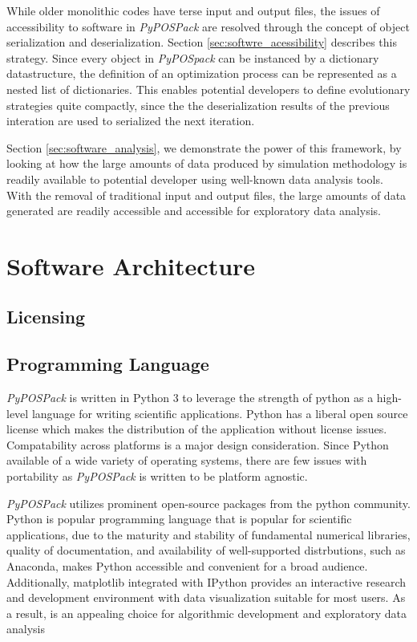 While older monolithic codes have terse input and output files, the issues of accessibility to software in \emph{PyPOSPack} are resolved through the concept of object serialization and deserialization.  Section \ref{sec:softwre_acessibility} describes this strategy.  Since every object in \emph{PyPOSpack} can be instanced by a dictionary datastructure, the definition of an optimization process can be represented as a nested list of dictionaries.  This enables potential developers to define evolutionary strategies quite compactly, since the the deserialization results of the previous interation are used to serialized the next iteration.

Section \ref{sec:software_analysis}, we demonstrate the power of this framework, by looking at how the large amounts of data produced by simulation methodology is readily available to potential developer using well-known data analysis tools.  With the removal of traditional input and output files, the large amounts of data generated are readily accessible and accessible for exploratory data analysis.

\section{Software Architecture}
\label{sec:software_architecture}

\subsection{Licensing}

\subsection{Programming Language}
\emph{PyPOSPack} is written in Python 3 to leverage the strength of python as a high-level language for writing scientific applications.  Python has a liberal open source license which makes the distribution of the application without license issues.  Compatability across platforms is a major design consideration.  Since Python available of a wide variety of operating systems, there are few issues with portability as \emph{PyPOSPack} is written to be platform agnostic.

\emph{PyPOSPack} utilizes prominent open-source packages from the python community.  Python is popular programming language that is popular for scientific applications, due to the maturity and stability of fundamental numerical libraries, quality of documentation, and availability of well-supported distrbutions, such as Anaconda\cite{python_anaconda}, makes Python accessible and convenient for a broad audience.  Additionally, matplotlib\cite{hunter2007_matplotlib} integrated with IPython\cite{} provides an interactive research and development environment with data visualization suitable for most users.  As a result, is an appealing choice for algorithmic development and exploratory data analysis\cite{dubois2007_python}


